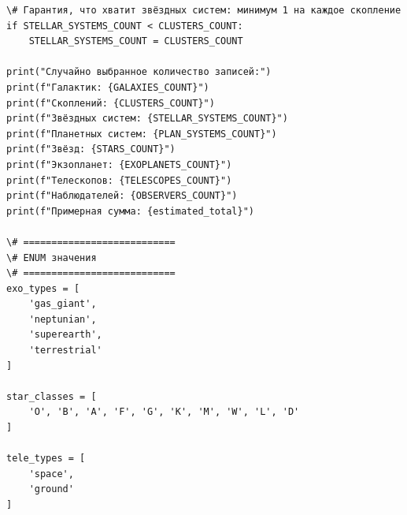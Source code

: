 \documentclass[14pt,a4paper]{extarticle}
\begin{document}
\begin{lstlisting}
\# Гарантия, что хватит звёздных систем: минимум 1 на каждое скопление
if STELLAR_SYSTEMS_COUNT < CLUSTERS_COUNT:
    STELLAR_SYSTEMS_COUNT = CLUSTERS_COUNT

print("Случайно выбранное количество записей:")
print(f"Галактик: {GALAXIES_COUNT}")
print(f"Скоплений: {CLUSTERS_COUNT}")
print(f"Звёздных систем: {STELLAR_SYSTEMS_COUNT}")
print(f"Планетных систем: {PLAN_SYSTEMS_COUNT}")
print(f"Звёзд: {STARS_COUNT}")
print(f"Экзопланет: {EXOPLANETS_COUNT}")
print(f"Телескопов: {TELESCOPES_COUNT}")
print(f"Наблюдателей: {OBSERVERS_COUNT}")
print(f"Примерная сумма: {estimated_total}")

\# ===========================
\# ENUM значения
\# ===========================
exo_types = [
    'gas_giant',
    'neptunian',
    'superearth',
    'terrestrial'
]

star_classes = [
    'O', 'B', 'A', 'F', 'G', 'K', 'M', 'W', 'L', 'D'
]

tele_types = [
    'space',
    'ground'
]


\end{lstlisting}
\end{document}
